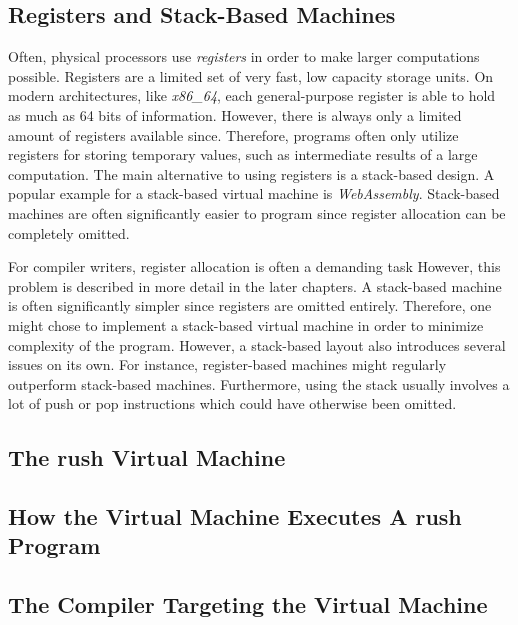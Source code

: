\noindent
\begin{figure}[H]
    \caption{}
    \begin{minipage}{.5\textwidth}
        \centering
    \end{minipage}%
    \begin{minipage}{.5\textwidth}
    \end{minipage}
\end{figure}

\subsection{Registers and Stack-Based Machines}

Often, physical processors use \emph{registers} in order to make larger computations possible.
Registers are a limited set of very fast, low capacity storage units.
On modern architectures, like \emph{x86\_64}, each general-purpose register is able to hold as much as 64 bits of information.
However, there is always only a limited amount of registers available since.
Therefore, programs often only utilize registers for storing temporary values, such as intermediate results of a large computation.
The main alternative to using registers is a stack-based design.
A popular example for a stack-based virtual machine is \emph{WebAssembly}.
Stack-based machines are often significantly easier to program since register allocation can be completely omitted.

For compiler writers, register allocation is often a demanding task
However, this problem is described in more detail in the later chapters.
A stack-based machine is often significantly simpler since registers are omitted entirely.
Therefore, one might chose to implement a stack-based virtual machine in order to minimize complexity of the program.
However, a stack-based layout also introduces several issues on its own.
For instance, register-based machines might regularly outperform stack-based machines.
Furthermore, using the stack usually involves a lot of push or pop instructions which could have otherwise been omitted.

\subsection{The rush Virtual Machine}

\subsection{How the Virtual Machine Executes A rush Program}
\subsection{The Compiler Targeting the Virtual Machine}
